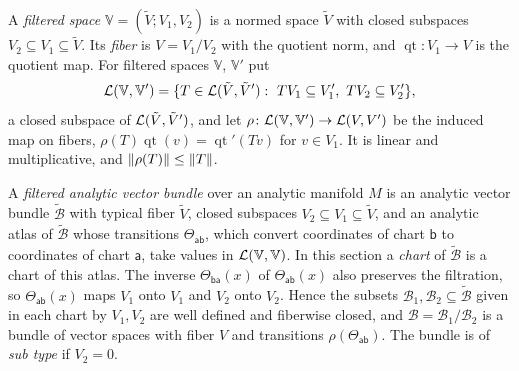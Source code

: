 \begin{definition}\label{amb:def:filtered}
A \emph{filtered space} $\mathbb V=(\tilde V;V_1,V_2)$ is a normed space $\tilde V$ with closed subspaces $V_2\subseteq V_1\subseteq\tilde V$. Its \emph{fiber} is $V=V_1/V_2$ with the quotient norm, and $\operatorname{qt}\colon V_1\to V$ is the quotient map. For filtered spaces $\mathbb V$, $\mathbb V'$ put
\[
 \mathcal L(\mathbb V,\mathbb V')=\{T\in\mathcal L(\tilde V,\tilde V'):\ TV_1\subseteq V_1',\ TV_2\subseteq V_2'\},
\]
a closed subspace of $\mathcal L(\tilde V,\tilde V')$, and let $\rho\colon\mathcal L(\mathbb V,\mathbb V')\to\mathcal L(V,V')$ be the induced map on fibers, $\rho(T)\operatorname{qt}(v)=\operatorname{qt}'(Tv)$ for $v\in V_1$. It is linear and multiplicative, and $\lVert \rho(T)\rVert\le\lVert T\rVert$.

A \emph{filtered analytic vector bundle} over an analytic manifold $M$ is an analytic vector bundle $\widetilde{\mathcal B}$ with typical fiber $\tilde V$, closed subspaces $V_2\subseteq V_1\subseteq\tilde V$, and an analytic atlas of $\widetilde{\mathcal B}$ whose transitions $\Theta_{\mathsf{ab}}$, which convert coordinates of chart $\mathsf b$ to coordinates of chart $\mathsf a$, take values in $\mathcal L(\mathbb V,\mathbb V)$. In this section a \emph{chart} of $\widetilde{\mathcal B}$ is a chart of this atlas. The inverse $\Theta_{\mathsf{ba}}(x)$ of $\Theta_{\mathsf{ab}}(x)$ also preserves the filtration, so $\Theta_{\mathsf{ab}}(x)$ maps $V_1$ onto $V_1$ and $V_2$ onto $V_2$. Hence the subsets $\mathcal B_1,\mathcal B_2\subseteq\widetilde{\mathcal B}$ given in each chart by $V_1,V_2$ are well defined and fiberwise closed, and $\mathcal B=\mathcal B_1/\mathcal B_2$ is a bundle of vector spaces with fiber $V$ and transitions $\rho(\Theta_{\mathsf{ab}})$. The bundle is of \emph{sub type} if $V_2=0$.
\end{definition}

